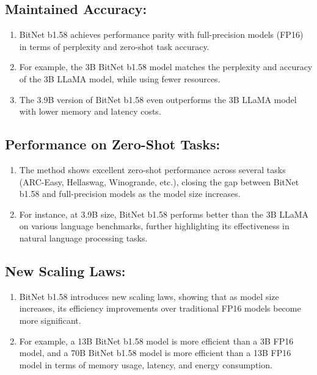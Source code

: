 \documentclass{report}
\begin{document}
	
	\subsection{Maintained Accuracy:}
	\begin{enumerate}
		\item 
		BitNet b1.58 achieves performance parity with full-precision models (FP16) in terms of perplexity and zero-shot task accuracy.
		
		\item 
		For example, the 3B BitNet b1.58 model matches the perplexity and accuracy of the 3B LLaMA model, while using fewer resources.
		
		\item 
		The 3.9B version of BitNet b1.58 even outperforms the 3B LLaMA model with lower memory and latency costs.
	\end{enumerate}
	
	
	\subsection{Performance on Zero-Shot Tasks:}
	\begin{enumerate}
		\item 
		The method shows excellent zero-shot performance across several tasks (ARC-Easy, Hellaswag, Winogrande, etc.), closing the gap between BitNet b1.58 and full-precision models as the model size increases.
		
		\item 
		For instance, at 3.9B size, BitNet b1.58 performs better than the 3B LLaMA on various language benchmarks, further highlighting its effectiveness in natural language processing tasks.
	\end{enumerate}
	
	
	\subsection{New Scaling Laws:}
	\begin{enumerate}
		\item 
		BitNet b1.58 introduces new scaling laws, showing that as model size increases, its efficiency improvements over traditional FP16 models become more significant.
		
		\item 
		For example, a 13B BitNet b1.58 model is more efficient than a 3B FP16 model, and a 70B BitNet b1.58 model is more efficient than a 13B FP16 model in terms of memory usage, latency, and energy consumption.
	\end{enumerate}
	
\end{document}
